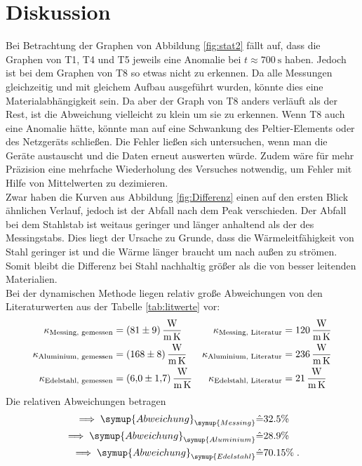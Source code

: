 \section{Diskussion}
\label{sec:Diskussion}
Bei Betrachtung der Graphen von Abbildung \ref{fig:stat2} fällt auf, dass die Graphen von T1, T4 und T5 jeweils eine Anomalie bei $t \approx \SI{700}{\second}$ haben.
Jedoch ist bei dem Graphen von T8 so etwas nicht zu erkennen. Da alle Messungen gleichzeitig und mit gleichem Aufbau ausgeführt wurden, 
könnte dies eine Materialabhängigkeit sein. Da aber der Graph von T8 anders verläuft als der Rest, ist die Abweichung vielleicht zu klein um sie zu erkennen.
Wenn T8 auch eine Anomalie hätte, könnte man auf eine Schwankung des Peltier-Elements oder des Netzgeräts schließen.
Die Fehler ließen sich untersuchen, wenn man die Geräte austauscht und die Daten erneut auswerten würde. 
Zudem wäre für mehr Präzision eine mehrfache Wiederholung des Versuches notwendig, um Fehler mit Hilfe von Mittelwerten zu dezimieren.
\\
Zwar haben die Kurven aus Abbildung \ref{fig:Differenz} einen auf den ersten Blick ähnlichen Verlauf, jedoch ist der Abfall nach dem Peak verschieden.
Der Abfall bei dem Stahlstab ist weitaus geringer und länger anhaltend als der des Messingstabs. Dies liegt der Ursache zu Grunde, dass
die Wärmeleitfähigkeit von Stahl geringer ist und die Wärme länger braucht um nach außen zu strömen. Somit bleibt die Differenz bei Stahl nachhaltig größer
als die von besser leitenden Materialien.
\\
Bei der dynamischen Methode liegen relativ große Abweichungen von den Literaturwerten aus der Tabelle \ref{tab:litwerte} vor:
\begin{align*}
    \kappa_\text{Messing, gemessen} &= \SI{81 \pm 9}{\watt\per\metre\per\kelvin} & \kappa_\text{Messing, Literatur} &= \SI{120}{\watt\per\metre\per\kelvin}\\
    \kappa_\text{Aluminium, gemessen} &= \SI{168 \pm 8}{\watt\per\metre\per\kelvin} & \kappa_\text{Aluminium, Literatur} &= \SI{236}{\watt\per\metre\per\kelvin}\\
    \kappa_\text{Edelstahl, gemessen} &= \SI{6 \pm 1.7}{\watt\per\metre\per\kelvin} & \kappa_\text{Edelstahl, Literatur} &= \SI{21}{\watt\per\metre\per\kelvin}
\end{align*}
Die relativen Abweichungen betragen
\begin{align*}
    \implies \symup{Abweichung}_{\symup{Messing}} &\hat{=} 32.5 \%\\
    \implies \symup{Abweichung}_{\symup{Aluminium}} &\hat{=} 28.9\%\\
    \implies \symup{Abweichung}_{\symup{Edelstahl}} &\hat{=} 70.15 \% \; \text{.}
\end{align*}

